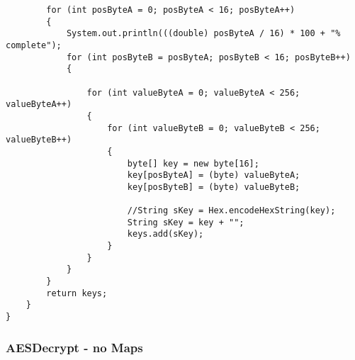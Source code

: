 \documentclass[12pt]{article}
\theoremstyle{plain}
\begin{document}
\begin{lstlisting}
		for (int posByteA = 0; posByteA < 16; posByteA++)
		{
			System.out.println(((double) posByteA / 16) * 100 + "% complete");
			for (int posByteB = posByteA; posByteB < 16; posByteB++)
			{

				for (int valueByteA = 0; valueByteA < 256; valueByteA++)
				{
					for (int valueByteB = 0; valueByteB < 256; valueByteB++)
					{
						byte[] key = new byte[16];
						key[posByteA] = (byte) valueByteA;
						key[posByteB] = (byte) valueByteB;

						//String sKey = Hex.encodeHexString(key);
						String sKey = key + "";
						keys.add(sKey);
					}
				}
			}
		}
		return keys;
	}
}
\end{lstlisting}
\subsubsection{AESDecrypt - no Maps}
\end{document}
